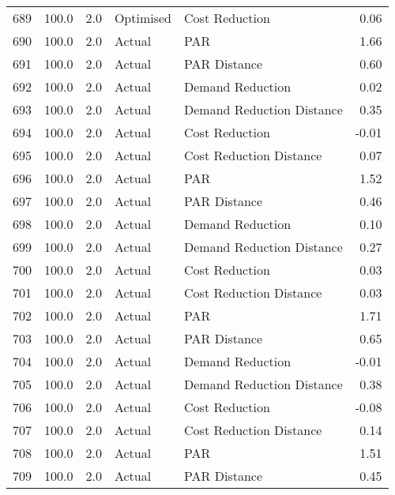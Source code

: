 \begin{longtable}{lrrllr}
689  &        100.0 &     2.0 &      Optimised &             Cost Reduction &   0.06 \\
690  &        100.0 &     2.0 &         Actual &                        PAR &   1.66 \\
691  &        100.0 &     2.0 &         Actual &               PAR Distance &   0.60 \\
692  &        100.0 &     2.0 &         Actual &           Demand Reduction &   0.02 \\
693  &        100.0 &     2.0 &         Actual &  Demand Reduction Distance &   0.35 \\
694  &        100.0 &     2.0 &         Actual &             Cost Reduction &  -0.01 \\
695  &        100.0 &     2.0 &         Actual &    Cost Reduction Distance &   0.07 \\
696  &        100.0 &     2.0 &         Actual &                        PAR &   1.52 \\
697  &        100.0 &     2.0 &         Actual &               PAR Distance &   0.46 \\
698  &        100.0 &     2.0 &         Actual &           Demand Reduction &   0.10 \\
699  &        100.0 &     2.0 &         Actual &  Demand Reduction Distance &   0.27 \\
700  &        100.0 &     2.0 &         Actual &             Cost Reduction &   0.03 \\
701  &        100.0 &     2.0 &         Actual &    Cost Reduction Distance &   0.03 \\
702  &        100.0 &     2.0 &         Actual &                        PAR &   1.71 \\
703  &        100.0 &     2.0 &         Actual &               PAR Distance &   0.65 \\
704  &        100.0 &     2.0 &         Actual &           Demand Reduction &  -0.01 \\
705  &        100.0 &     2.0 &         Actual &  Demand Reduction Distance &   0.38 \\
706  &        100.0 &     2.0 &         Actual &             Cost Reduction &  -0.08 \\
707  &        100.0 &     2.0 &         Actual &    Cost Reduction Distance &   0.14 \\
708  &        100.0 &     2.0 &         Actual &                        PAR &   1.51 \\
709  &        100.0 &     2.0 &         Actual &               PAR Distance &   0.45 \\

\end{longtable}
